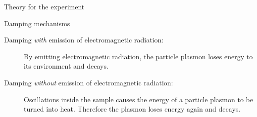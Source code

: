 \documentclass[pdftex, a4paper,11pt, twoside, UKenglish]{report}
\begin{document}
\begin{chapter}{Theory for the experiment}
\begin{section}{Damping mechanisms}
      \begin{description}
        \item[Damping \textit{with} emission of electromagnetic
        radiation:] By emitting electromagnetic radiation, the particle plasmon
        loses energy to its environment and decays.
        \item[Damping \textit{without} emission of electromagnetic
        radiation:] Oscillations inside the sample causes the energy of a
        particle plasmon to be turned into heat. Therefore the plasmon loses
        energy again and decays.
      \end{description}
      
    \end{section}
    
    
    

\end{chapter}
\end{document}
